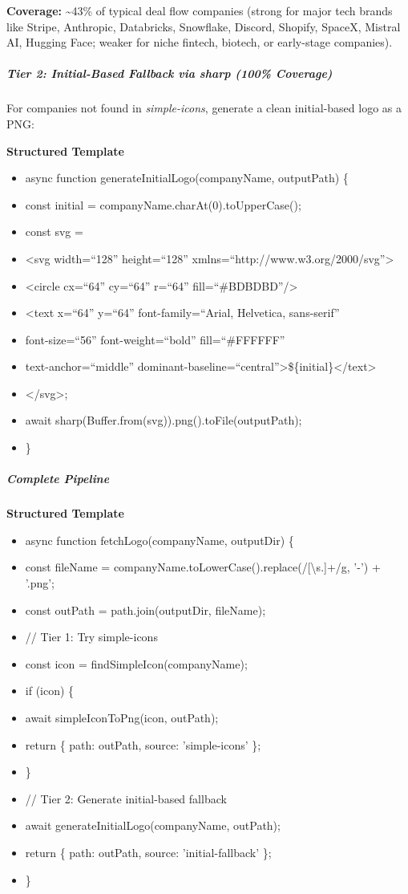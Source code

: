 \documentclass[11pt]{article}
\begin{document}
\textbf{Coverage:} \textasciitilde{}43\% of typical deal flow companies (strong for major tech brands like Stripe, Anthropic, Databricks, Snowflake, Discord, Shopify, SpaceX, Mistral AI, Hugging Face; weaker for niche fintech, biotech, or early-stage companies).


\subparagraph{Tier 2: Initial-Based Fallback via \emph{sharp} (100\% Coverage)}\mbox{}\par

For companies not found in \emph{simple-icons}, generate a clean initial-based logo as a PNG:


\textbf{Structured Template}
\begin{itemize}[leftmargin=*,itemsep=2pt,topsep=2pt]
\item {} async function generateInitialLogo(companyName, outputPath) \{
\item {} const initial = companyName.charAt(0).toUpperCase();
\item {} const svg =
\item {} <svg width=``128'' height=``128'' xmlns=``http://www.w3.org/2000/svg''>
\item {} <circle cx=``64'' cy=``64'' r=``64'' fill=``\#BDBDBD''/>
\item {} <text x=``64'' y=``64'' font-family=``Arial, Helvetica, sans-serif''
\item {} font-size=``56'' font-weight=``bold'' fill=``\#FFFFFF''
\item {} text-anchor=``middle'' dominant-baseline=``central''>\$\{initial\}</text>
\item {} </svg>;
\item {} await sharp(Buffer.from(svg)).png().toFile(outputPath);
\item {} \}
\end{itemize}

\subparagraph{Complete Pipeline}\mbox{}\par

\textbf{Structured Template}
\begin{itemize}[leftmargin=*,itemsep=2pt,topsep=2pt]
\item {} async function fetchLogo(companyName, outputDir) \{
\item {} const fileName = companyName.toLowerCase().replace(/[\textbackslash{}s.]+/g, '-') + '.png';
\item {} const outPath = path.join(outputDir, fileName);
\item {} // Tier 1: Try simple-icons
\item {} const icon = findSimpleIcon(companyName);
\item {} if (icon) \{
\item {} await simpleIconToPng(icon, outPath);
\item {} return \{ path: outPath, source: 'simple-icons' \};
\item {} \}
\item {} // Tier 2: Generate initial-based fallback
\item {} await generateInitialLogo(companyName, outPath);
\item {} return \{ path: outPath, source: 'initial-fallback' \};
\item {} \}
\end{itemize}
\end{document}
